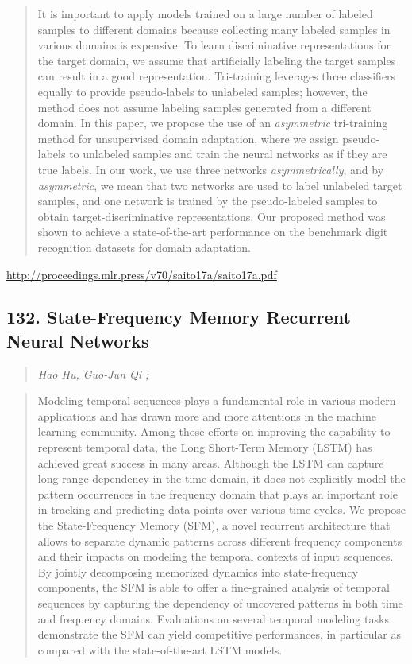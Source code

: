 \documentclass{article}
\begin{document}
\begin{quote}
    It is important to apply models trained on a large number of labeled samples to different domains because collecting many labeled samples in various domains is expensive. To learn discriminative representations for the target domain, we assume that artificially labeling the target samples can result in a good representation. Tri-training leverages three classifiers equally to provide pseudo-labels to unlabeled samples; however, the method does not assume labeling samples generated from a different domain. In this paper, we propose the use of an \textit{asymmetric} tri-training method for unsupervised domain adaptation, where we assign pseudo-labels to unlabeled samples and train the neural networks as if they are true labels. In our work, we use three networks \textit{asymmetrically}, and by \textit{asymmetric}, we mean that two networks are used to label unlabeled target samples, and one network is trained by the pseudo-labeled samples to obtain target-discriminative representations. Our proposed method was shown to achieve a state-of-the-art performance on the benchmark digit recognition datasets for domain adaptation.  
\end{quote}

\href{http://proceedings.mlr.press/v70/saito17a/saito17a.pdf}{http://proceedings.mlr.press/v70/saito17a/saito17a.pdf}

\subsection{132. State-Frequency Memory Recurrent Neural Networks}

\begin{quote}
\footnotesize{\textit{Hao Hu, Guo-Jun Qi ;}}

\end{quote}

\begin{quote}
    Modeling temporal sequences plays a fundamental role in various modern applications and has drawn more and more attentions in the machine learning community. Among those efforts on improving the capability to represent temporal data, the Long Short-Term Memory (LSTM) has achieved great success in many areas. Although the LSTM can capture long-range dependency in the time domain, it does not explicitly model the pattern occurrences in the frequency domain that plays an important role in tracking and predicting data points over various time cycles. We propose the State-Frequency Memory (SFM), a novel recurrent architecture that allows to separate dynamic patterns across different frequency components and their impacts on modeling the temporal contexts of input sequences. By jointly decomposing memorized dynamics into state-frequency components, the SFM is able to offer a fine-grained analysis of temporal sequences by capturing the dependency of uncovered patterns in both time and frequency domains. Evaluations on several temporal modeling tasks demonstrate the SFM can yield competitive performances, in particular as compared with the state-of-the-art LSTM models.  
\end{quote}
\end{document}
